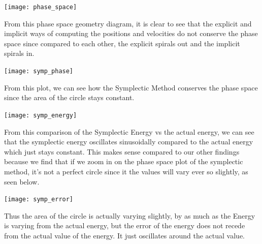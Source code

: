 \documentclass[10pt]{report}
\begin{document}
\texttt{[image: phase\_space]}

From this phase space geometry diagram, it is clear to see that the explicit and implicit ways of computing the positions and velocities do not conserve the phase space since compared to each other, the explicit spirals out and the implicit spirals in.

\texttt{[image: symp\_phase]}

From this plot, we can see how the Symplectic Method conserves the phase space since the area of the circle stays constant.

\texttt{[image: symp\_energy]}

From this comparison of the Symplectic Energy vs the actual energy, we can see that the symplectic energy oscillates sinusoidally compared to the actual energy which just stays constant. This makes sense compared to our other findings because we find that if we zoom in on the phase space plot of the symplectic method, it's not a perfect circle since it the values will vary ever so slightly, as seen below.

\texttt{[image: symp\_error]}

Thus the area of the circle is actually varying slightly, by as much as the Energy is varying from the actual energy, but the error of the energy does not recede from the actual value of the energy. It just oscillates around the actual value.
 
\end{document}
